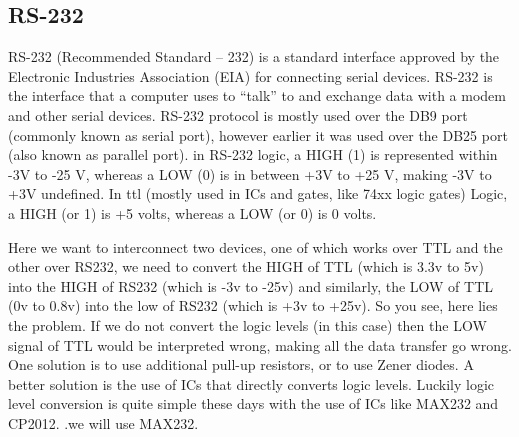 \documentclass[12pt, a4paper, twoside]{report}
\begin{document}
\subsection{RS-232}
RS-232 (Recommended Standard – 232) is a standard interface approved by the Electronic Industries Association (EIA) for connecting serial devices. RS-232 is the interface that a computer uses to ``talk'' to and exchange data with a modem and other serial devices. RS-232 protocol is mostly used over the DB9 port (commonly known as serial port), however earlier it was used over the DB25 port (also known as parallel port). in RS-232 logic, a HIGH (1) is represented within -3V to -25 V, whereas a LOW (0) is in between +3V to +25 V, making -3V to +3V undefined. In \acrshort{ttl} (mostly used in ICs and gates, like 74xx logic gates) Logic, a HIGH (or 1) is +5 volts, whereas a LOW (or 0) is 0 volts.
\par
Here we want to interconnect two devices, one of which works over TTL and the other over RS232, we need to convert the HIGH of TTL (which is 3.3v to 5v) into the HIGH of RS232 (which is -3v to -25v) and similarly, the LOW of TTL (0v to 0.8v) into the low of RS232 (which is +3v to +25v). So you see, here lies the problem. If we do not convert the logic levels (in this case) then the LOW signal of TTL would be interpreted wrong, making all the data transfer go wrong. One solution is to use additional pull-up resistors, or to use Zener diodes. A better solution is the use of ICs that directly converts logic levels. Luckily logic level conversion is quite simple these days with the use of ICs like MAX232 and CP2012. .we will use MAX232.
\end{document}
